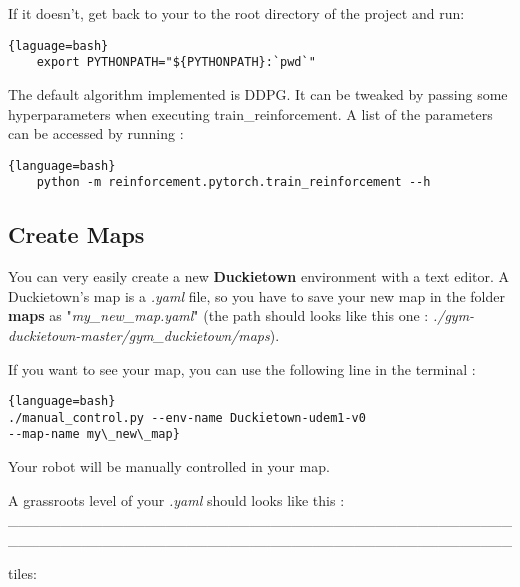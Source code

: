 \documentclass[12pt]{article}
\begin{document}
If it doesn't, get back to your to the root directory of the project and run: 

\begin{lstlisting}{laguage=bash}
    export PYTHONPATH="${PYTHONPATH}:`pwd`"
\end{lstlisting}

The default algorithm implemented is DDPG. It can be tweaked by passing some hyperparameters when executing train\_reinforcement. A list of the parameters can be accessed by running :

\begin{lstlisting}{language=bash}
    python -m reinforcement.pytorch.train_reinforcement --h
\end{lstlisting}

\subsection{Create Maps}
You can very easily create a new \textbf{Duckietown} environment with a text editor. A Duckietown's map is a \textit{.yaml} file, so you have to save your new map in the folder \textbf{maps} as "\textit{my\_new\_map.yaml}" (the path should looks like this one : \textit{./gym-duckietown-master/gym\_duckietown/maps}).
\newline

If you want to see your map, you can use the following line in the terminal : \newline

\begin{lstlisting}{language=bash}
./manual_control.py --env-name Duckietown-udem1-v0 
--map-name my\_new\_map}
\end{lstlisting}

\noindent Your robot will be manually controlled in your map.\newline


\noindent A grassroots level of your \textit{.yaml} should looks like this :\newline
\_\_\_\_\_\_\_\_\_\_\_\_\_\_\_\_\_\_\_\_\_\_\_\_\_\_\_\_\_\_\_\_\_\_\_\_\_\_\_\_\_\_\_\_\_\_\_\_\_\_\_\_\_\_\_\_\_\_\_\_\_\_\_\_\_\_\_\_\_\_\_\_\_\_\_\_\_\_\_\_\_\_\_\_\_\_\_\_\_\_\_\_\_\_\_\_

\noindent tiles:\newline
\end{document}
